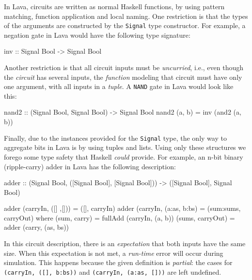             In Lava, circuits are written as normal Haskell functions, by using pattern matching,
            function application and local naming.
            One restriction is that the types of the arguments are
            constructed by the \texttt{Signal} type constructor.
            For example, a negation gate in Lava would have the following type signature:

            \begin{haskellcode}
        inv :: Signal Bool -> Signal Bool
            \end{haskellcode}

            Another restriction is that all circuit inputs must be \emph{uncurried}, i.e.,
            even though the \emph{circuit} has several inputs, the \emph{function} modeling that circuit
            must have only one argument, with all inputs in a \emph{tuple}.
            A \texttt{NAND} gate in Lava would look like this:

            \begin{haskellcode}
        nand2 :: (Signal Bool, Signal Bool) -> Signal Bool
        nand2 (a, b) = inv (and2 (a, b))
            \end{haskellcode}

            Finally, due to the instances provided for the \texttt{Signal} type, the only way to
            aggregate bits in Lava is by using tuples and lists.
            Using only these structures we forego some type safety that Haskell \emph{could} provide.
            For example, an n-bit binary (ripple-carry) adder in Lava has the following description:

            \begin{haskellcode}
        adder :: (Signal Bool, ([Signal Bool], [Signal Bool]))
              -> ([Signal Bool], Signal Bool)

        adder (carryIn, ([] ,[]))    = ([], carryIn)
        adder (carryIn, (a:as, b:bs) = (sum:sums, carryOut)
            where (sum, carry)     = fullAdd (carryIn, (a, b))
                  (sums, carryOut) = adder (carry, (as, bs))
            \end{haskellcode}

            In this circuit description, there is an \emph{expectation} that both inputs have the same size.
            When this expectation is not met, a \emph{run-time} error will occur during simulation.
            This happens because the given definition is \emph{partial}: the cases for
            \texttt{(carryIn, ([], b:bs))} and \texttt{(carryIn, (a:as, []))} are left undefined.

